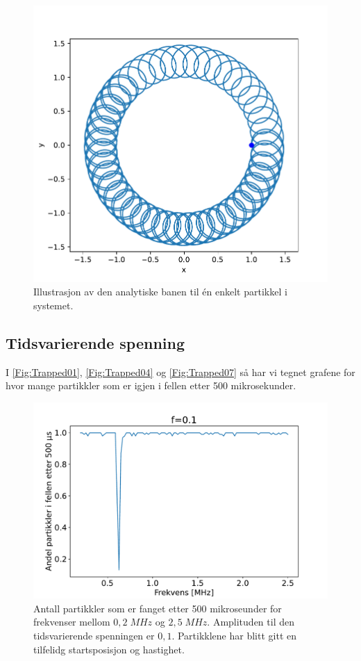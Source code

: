 \documentclass[reprint,english,notitlepage, nofootinbib]{revtex4-1}  %
\begin{document}
\begin{figure}[H]
\centering
\includegraphics[scale=0.5]{../Images/AnalyticA.pdf}
\caption{Illustrasjon av den analytiske banen til én enkelt partikkel i systemet.}
\label{Fig:Analytic}
\end{figure}

\subsection*{Tidsvarierende spenning}

I \autoref{Fig:Trapped01}, \autoref{Fig:Trapped04} og \autoref{Fig:Trapped07} så har vi tegnet grafene for hvor mange partikkler som er igjen i fellen etter 500 mikrosekunder. 

\begin{figure}[H]
\centering
\includegraphics[scale=0.4]{../Images/0Trapped.pdf}
\caption{Antall partikkler som er fanget etter 500 mikroseunder for frekvenser mellom $0,2 \; MHz$ og $2,5 \; MHz$. Amplituden til den tidsvarierende spenningen er $0,1$. Partikklene har blitt gitt en tilfelidg startsposisjon og hastighet.}
\label{Fig:Trapped01}
\end{figure}
\end{document}
